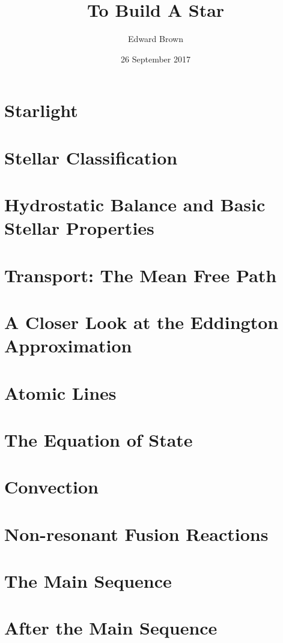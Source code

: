 \documentclass[profonts,stix,symmetric]{astro-bookshelf}
\title{To Build A Star}
\author{Edward Brown}
\date{26 September 2017}
\begin{document}
\frontmatter
{}


\mainmatter
{}
\setcounter{page}{1}

\chapter{Starlight}\label{ch.starlight}


\chapter{Stellar Classification}\label{ch.classifying-stars}


\chapter{Hydrostatic Balance and Basic Stellar Properties}\label{ch.hydrostatic-balance}


\chapter{Transport: The Mean Free Path}\label{ch.mean-free-path}


\chapter{A Closer Look at the Eddington Approximation}\label{ch.stellar-atmospheres}


\chapter{Atomic Lines}\label{ch.atomic-lines}


\chapter{The Equation of State}\label{ch.degeneracy}


\chapter{Convection}\label{ch.convection}


\chapter{Non-resonant Fusion Reactions}\label{ch.nuclear-burning}


\chapter{The Main Sequence}\label{ch.main-sequence}


\chapter{After the Main Sequence}\label{ch.post-main-sequence}



\backmatter


\end{document}
